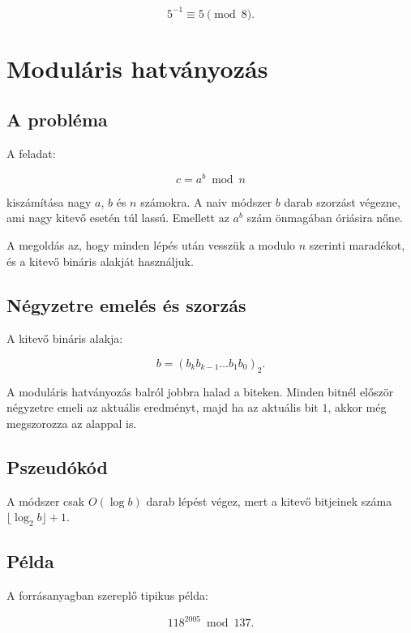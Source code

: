 \[
5^{-1}\equiv5\pmod8.
\]

\section{Moduláris hatványozás}

\subsection{A probléma}

A feladat:

\[
c=a^b\bmod n
\]

kiszámítása nagy $a$, $b$ és $n$ számokra. A naiv módszer $b$ darab szorzást végezne, ami nagy kitevő esetén túl lassú. Emellett az $a^b$ szám önmagában óriásira nőne.

A megoldás az, hogy minden lépés után vesszük a modulo $n$ szerinti maradékot, és a kitevő bináris alakját használjuk.

\subsection{Négyzetre emelés és szorzás}

A kitevő bináris alakja:

\[
b=(b_kb_{k-1}\ldots b_1b_0)_2.
\]

A moduláris hatványozás balról jobbra halad a biteken. Minden bitnél először négyzetre emeli az aktuális eredményt, majd ha az aktuális bit $1$, akkor még megszorozza az alappal is.



\subsection{Pszeudókód}


A módszer csak $O(\log b)$ darab lépést végez, mert a kitevő bitjeinek száma $\lfloor\log_2 b\rfloor+1$.

\subsection{Példa}

A forrásanyagban szereplő tipikus példa:

\[
118^{2005}\bmod137.
\]

